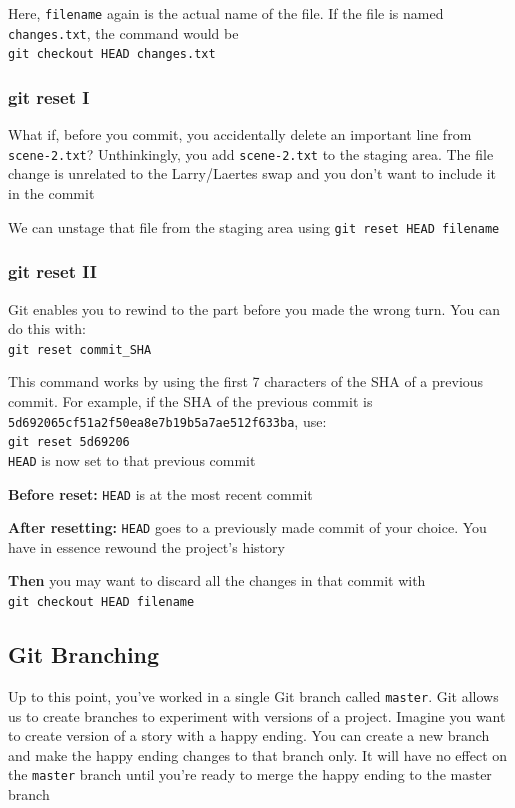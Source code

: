 \documentclass[a4paper, 12pt]{article}
\begin{document}
Here, \verb|filename| again is the actual name of the file. If the file is named \verb|changes.txt|, the command would be\\
\verb|git checkout HEAD changes.txt|


\subsubsection{git reset I}

What if, before you commit, you accidentally delete an important line from \verb|scene-2.txt|? Unthinkingly, you add \verb|scene-2.txt| to the staging area. The file change is unrelated to the Larry/Laertes swap and you don't want to include it in the commit

We can unstage that file from the staging area using \verb|git reset HEAD filename|

\subsubsection{git reset II}
Git enables you to rewind to the part before you made the wrong turn. You can do this with:\\ 
\verb|git reset commit_SHA|

This command works by using the first 7 characters of the SHA of a previous commit. For example, if the SHA of the previous commit is\\ \verb|5d692065cf51a2f50ea8e7b19b5a7ae512f633ba|, use:\\
\verb|git reset 5d69206|\\
\verb|HEAD| is now set to that previous commit

\textbf{Before reset:} \verb|HEAD| is at the most recent commit

\textbf{After resetting:} \verb|HEAD| goes to a previously made commit of your choice. You have in essence rewound the project's history

\textbf{Then} you may want to discard all the changes in that commit with\\ \verb|git checkout HEAD filename|



\subsection{Git Branching}
Up to this point, you've worked in a single Git branch called \verb|master|. Git allows us to create branches to experiment with versions of a project. Imagine you want to create version of a story with a happy ending. You can create a new branch and make the happy ending changes to that branch only. It will have no effect on the \verb|master| branch until you're ready to merge the happy ending to the master branch
\end{document}
